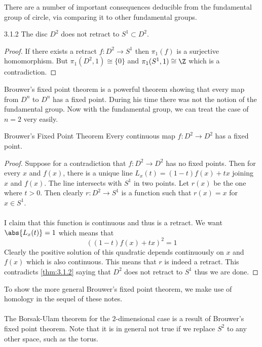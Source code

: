 \documentclass[a4paper]{article}
\begin{document}
There are a number of important consequences deducible from the fundamental group of circle, via comparing it to other fundamental groups. 

\begin{prp}{}{3.1.2} The disc $D^2$ does not retract to $S^1\subset D^2$. \tcbline
\begin{proof}
If there exists a retract $f:D^2\to S^1$ then $\pi_1(f)$ is a surjective homomorphism. But $\pi_1	(D^2,1)\cong\{0\}$ and $\pi_1(S^1,1)\cong\Z$ which is a contradiction. 
\end{proof}
\end{prp}

Brouwer's fixed point theorem is a powerful theorem showing that every map from $D^n$ to $D^n$ has a fixed point. During his time there was not the notion of the fundamental group. Now with the fundamental group, we can treat the case of $n=2$ very easily. 

\begin{prp}{Brouwer's Fixed Point Theorem}{} Every continuous map $f:D^2\to D^2$ has a fixed point. \tcbline
\begin{proof}
Suppose for a contradiction that $f:D^2\to D^2$ has no fixed points. Then for every $x$ and $f(x)$, there is a unique line $L_x(t)=(1-t)f(x)+tx$ joining $x$ and $f(x)$. The line intersects with $S^1$ in two points. Let $r(x)$ be the one where $t>0$. Then clearly $r:D^2\to S^1$ is a function such that $r(x)=x$ for $x\in S^1$. \\~\\
I claim that this function is continuous and thus is a retract. We want $\abs{L_x(t)}=1$ which means that $$((1-t)f(x)+tx)^2=1$$ Clearly the positive solution of this quadratic depends continuously on $x$ and $f(x)$ which is also continuous. This means that $r$ is indeed a retract. This contradicts \ref{thm:3.1.2} saying that $D^2$ does not retract to $S^1$ thus we are done. 
\end{proof}
\end{prp}

To show the more general Brouwer's fixed point theorem, we make use of homology in the sequel of these notes. \\~\\

The Borsak-Ulam theorem for the $2$-dimensional case is a result of Brouwer's fixed point theorem. Note that it is in general not true if we replace $S^2$ to any other space, such as the torus. 
\end{document}
